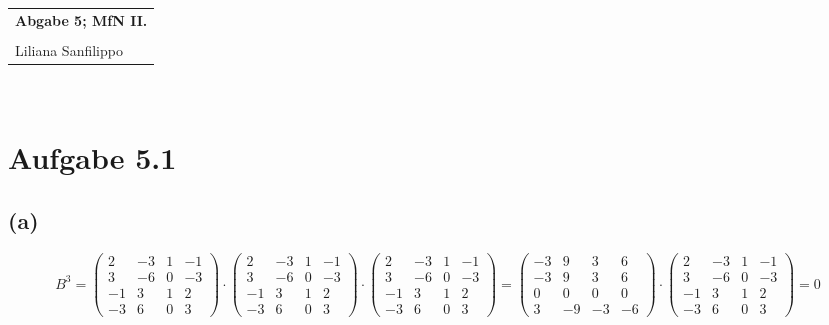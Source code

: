 \documentclass{article} %
\newcommand{\titulo}{Abgabe 5; MfN II.}
\newcommand{\nombre}{Liliana Sanfilippo}
\begin{document}
\begin{tabular}{p{12cm}}
{{\Large\bf\titulo}}\\
\vspace{0.2cm}\\
 {\large\nombre}\\
\end{tabular}
\vspace{0.2cm}\\
\section{Aufgabe 5.1}
\subsection*{(a)}
\[
B^3 = \begin{pmatrix}
2 & -3 & 1 & -1 \\
3 & -6 & 0 & -3 \\
-1 & 3 & 1 & 2 \\
-3 & 6 & 0 & 3
\end{pmatrix} \cdot \begin{pmatrix}
2 & -3 & 1 & -1 \\
3 & -6 & 0 & -3 \\
-1 & 3 & 1 & 2 \\
-3 & 6 & 0 & 3
\end{pmatrix} \cdot \begin{pmatrix}
2 & -3 & 1 & -1 \\
3 & -6 & 0 & -3 \\
-1 & 3 & 1 & 2 \\ 
-3 & 6 & 0 & 3
\end{pmatrix} = \begin{pmatrix}
-3 & 9 & 3 & 6 \\
-3 & 9 & 3 & 6 \\
0 & 0 & 0 & 0 \\
3 & -9 & -3 & -6
\end{pmatrix} \cdot \begin{pmatrix}
2 & -3 & 1 & -1 \\
3 & -6 & 0 & -3 \\
-1 & 3 & 1 & 2 \\
-3 & 6 & 0 & 3
\end{pmatrix} = 0
\]
\end{document}
